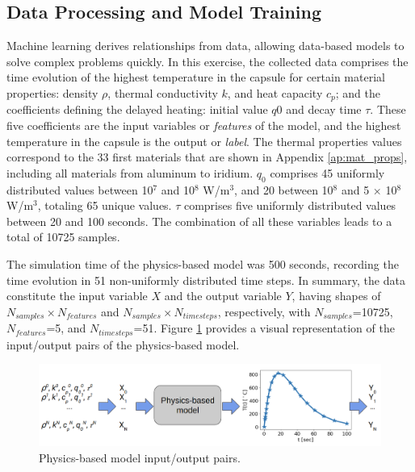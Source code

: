 \subsection{Data Processing and Model Training}
\label{sec:datapros}

Machine learning derives relationships from data, allowing data-based models to solve complex problems quickly.
In this exercise, the collected data comprises the time evolution of the highest temperature in the capsule for certain material properties: density $\rho$, thermal conductivity $k$, and heat capacity $c_p$; and the coefficients defining the delayed heating: initial value $q0$ and decay time $\tau$.
These five coefficients are the input variables or \textit{features} of the model, and the highest temperature in the capsule is the output or \textit{label}.
The thermal properties values correspond to the 33 first materials that are shown in Appendix \ref{ap:mat_props}, including all materials from aluminum to iridium.
$q_0$ comprises 45 uniformly distributed values between 10$^7$ and 10$^8$ W/m$^3$, and 20 between 10$^8$ and 5 $\times$ 10$^8$ W/m$^3$, totaling 65 unique values.
$\tau$ comprises five uniformly distributed values between 20 and 100 seconds.
The combination of all these variables leads to a total of 10725 samples.

The simulation time of the physics-based model was 500 seconds, recording the time evolution in 51 non-uniformly distributed time steps.
In summary, the data constitute the input variable $X$ and the output variable $Y$, having shapes of $N_{samples} \times N_{features}$ and $N_{samples} \times N_{timesteps}$, respectively, with $N_{samples}$=10725, $N_{features}$=5, and $N_{timesteps}$=51.
Figure \ref{fig:tf-data1} provides a visual representation of the input/output pairs of the physics-based model.

\begin{figure}[htbp!] %
    \centering
    \includegraphics[width=0.85\linewidth]{figures/data-process}
    \hfill
    \caption{Physics-based model input/output pairs.}
    \label{fig:tf-data1}
\end{figure}

